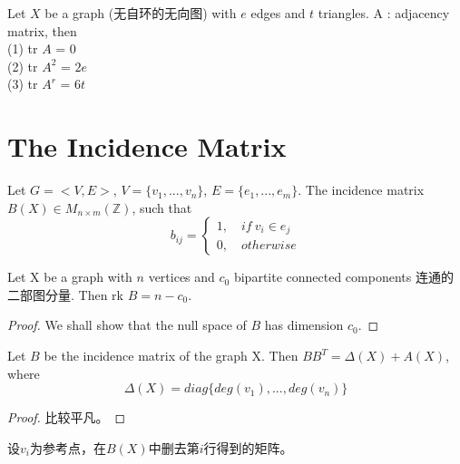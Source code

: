 \documentclass[11pt,fleqn]{book} %
\begin{document}
\begin{CJK}{UTF8}{gkai}
\begin{corollary}
    Let $X$ be a graph (无自环的无向图) with $e$ edges and $t$ triangles. A : adjacency matrix, then \\
    (1) tr $A$ = 0 \\
    (2) tr $A^2$ = $2e$ \\
    (3) tr $A^r$ = $6t$ 
\end{corollary}

\section{The Incidence Matrix}
\begin{definition}
     Let $G = <V, E>$, $V = \{v_1, ... ,v_n\}$, $E = \{e_1, ...,e_m\}$.
    The incidence matrix $B(X) \in M_{n\times m}(\mathbb{Z})$, such that
    \[
        b_{ij} = \begin{cases}
            1, \quad if \ v_i \in e_j \\
            0, \quad otherwise
        \end{cases}\]
\end{definition}

\begin{theorem}
    Let X be a graph with $n$ vertices and $c_0$ bipartite connected components 连通的二部图分量. Then rk $B = n - c_0$.
\end{theorem}
\begin{proof}
    We shall show that the null space of $B$ has dimension $c_0$.    
\end{proof}

\begin{lemma}
    Let $B$ be the incidence matrix of the graph X. Then $BB^T = \Delta(X) + A(X)$, where 
    \[
        \Delta(X) = diag\{deg(v_1), ... , deg(v_n)\}\]   
\end{lemma}
\begin{proof}
        比较平凡。    
\end{proof}

\begin{definition}
     设$v_i$为参考点，在$B(X)$中删去第$i$行得到的矩阵。
\end{definition}



\end{CJK}
\end{document}
